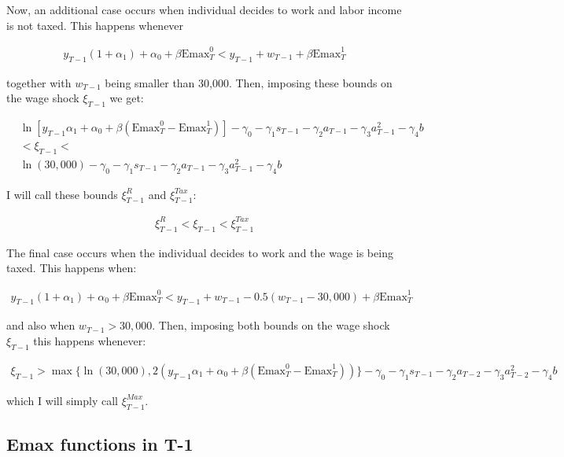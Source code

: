 \documentclass[11pt]{article}
\begin{document}
Now, an additional case occurs when individual decides to work and labor income is not taxed. This happens whenever

\begin{align}
	y_{T-1}(1+\alpha_1)+\alpha_0+\beta\text{Emax}_T^0<y_{T-1}+w_{T-1}+\beta\text{Emax}_{T}^1
\end{align}

together with $w_{T-1}$ being smaller than 30,000. Then, imposing these bounds on the wage shock $\xi_{T-1}$ we get:


\begin{align}
	& \ln \left[y_{T-1}\alpha_1+\alpha_0+\beta(\text{Emax}_T^0-\text{Emax}_T^1) \right]-\gamma_0-\gamma_1s_{T-1}-\gamma_2a_{T-1}-\gamma_3a_{T-1}^2-\gamma_4b  \nonumber \\[0.2in]
	& <\xi_{T-1} <\nonumber \\[0.2in]
	& \ln(30,000)-\gamma_0-\gamma_1s_{T-1}-\gamma_2a_{T-1}-\gamma_3a_{T-1}^2-\gamma_4b
\end{align}

I will call these bounds $\xi_{T-1}^R$ and $\xi_{T-1}^{Tax}$:

\begin{align}
	\xi_{T-1}^R<\xi_{T-1}<\xi_{T-1}^{Tax}
\end{align}

The final case occurs when the individual decides to work and the wage is being taxed. This happens when:

\begin{align}
	y_{T-1}(1+\alpha_1)+\alpha_0+\beta \text{Emax}_T^0<y_{T-1}+w_{T-1}-0.5(w_{T-1}-30,000)+\beta \text{Emax}_T^1
\end{align}

and also when $w_{T-1}>30,000$. Then, imposing both bounds on the wage shock $\xi_{T-1}$ this happens whenever:
\begin{footnotesize}
\begin{align}
	\xi_{T-1}>\max \{\ln(30,000),2 (y_{T-1}\alpha_1+\alpha_0+\beta(\text{Emax}_{T}^0-\text{Emax}_T^1))  \}-\gamma_0-\gamma_1s_{T-1}-\gamma_2a_{T-2}-\gamma_3a_{T-2}^2-\gamma_4b
\end{align}
\end{footnotesize}
which I will simply call $\xi_{T-1}^{Max}$. 

\subsection{Emax functions in T-1}
\end{document}
